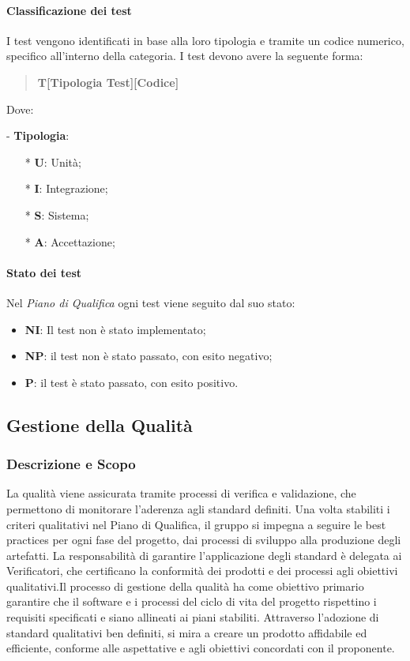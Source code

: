 \documentclass[10pt]{article}
\begin{document}
\begin{justify}
    \paragraph{Classificazione dei test}
    I test vengono identificati in base alla loro tipologia e tramite un codice numerico, specifico all'interno della categoria. I test devono avere la seguente forma:
    \begin{quote}
    \textbf{T[Tipologia Test][Codice]}\\
    \end{quote}
    Dove:
    \item [-] \textbf{Tipologia}:
    \begin{itemize}
        \item [*] \textbf{U}: Unità;
        \item [*] \textbf{I}: Integrazione;
        \item [*] \textbf{S}: Sistema;
        \item [*] \textbf{A}: Accettazione;
    \end{itemize}

    \paragraph{Stato dei test}
    Nel \textit{Piano di Qualifica} ogni test viene seguito dal suo stato:
    \begin{itemize}
    \item \textbf{NI}: Il test non è stato implementato;
    \item \textbf{NP}: il test non è stato passato, con esito negativo;
    \item \textbf{P}: il test è stato passato, con esito positivo.
    \end{itemize}

\subsection{Gestione della Qualità}

    \subsubsection{Descrizione e Scopo}
     La qualità viene assicurata tramite processi di verifica e validazione, che permettono di monitorare l’aderenza agli standard definiti. Una volta stabiliti i criteri qualitativi nel Piano di Qualifica, il gruppo si impegna a seguire le best practices per ogni fase del progetto, dai processi di sviluppo alla produzione degli artefatti. La responsabilità di garantire l’applicazione degli standard è delegata ai Verificatori, che certificano la conformità dei prodotti e dei processi agli obiettivi qualitativi.Il processo di gestione della qualità ha come obiettivo primario garantire che il software e i processi del ciclo di vita del progetto rispettino i requisiti specificati e siano allineati ai piani stabiliti. Attraverso l'adozione di standard qualitativi ben definiti, si mira a creare un prodotto affidabile ed efficiente, conforme alle aspettative e agli obiettivi concordati con il proponente.
    

\end{justify}
\end{document}
